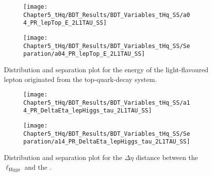 


\begin{figure}[h]
\centering
\begin{subfigure}{.45\textwidth}
  \centering
  \texttt{[image: Chapter5\_tHq/BDT\_Results/BDT\_Variables\_tHq\_SS/a04\_PR\_lepTop\_E\_2L1TAU\_SS]}
\end{subfigure}%
\begin{subfigure}{.55\textwidth}
  \centering
  \texttt{[image: Chapter5\_tHq/BDT\_Results/BDT\_Variables\_tHq\_SS/Separation/a04\_PR\_lepTop\_E\_2L1TAU\_SS]}
\end{subfigure}
\caption{Distribution and separation plot for the energy of the light-flavoured lepton originated from the top-quark-decay system. }
\label{fig:Appendix:BDTVARS:tHqSS:a04_PR_lepTop_E}
\end{figure}


\begin{figure}[h]
\centering
\begin{subfigure}{.45\textwidth}
  \centering
  \texttt{[image: Chapter5\_tHq/BDT\_Results/BDT\_Variables\_tHq\_SS/a14\_PR\_DeltaEta\_lepHiggs\_tau\_2L1TAU\_SS]}
\end{subfigure}%
\begin{subfigure}{.55\textwidth}
  \centering
  \texttt{[image: Chapter5\_tHq/BDT\_Results/BDT\_Variables\_tHq\_SS/Separation/a14\_PR\_DeltaEta\_lepHiggs\_tau\_2L1TAU\_SS]}
\end{subfigure}
\caption{Distribution and separation plot for the $\Delta \eta$ distance between the $\ell_{\text{Higgs}}$ and
the \tauhad. }
\label{fig:Appendix:BDTVARS:tHqSS:a14_PR_DeltaEta_lepHiggs_tau}
\end{figure}

